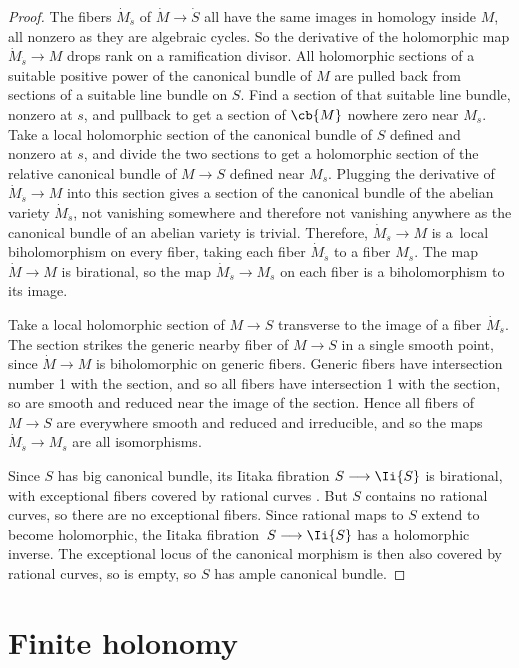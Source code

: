 \begin{proof}
The fibers $\dot{M}_{\dot{s}}$ of $\dot{M} \to \dot{S}$ all have the same images in homology inside $M$, all nonzero as they are algebraic cycles.
So the derivative of the holomorphic map $\dot{M}_{\dot{s}} \to M$ drops rank on a ramification divisor.
All holomorphic sections of a suitable positive power of the canonical bundle of $M$ are pulled back from sections of a suitable line bundle on $S$.
Find a section of that suitable line bundle, nonzero at $s$, and pullback to get a section of $\cb{M}$ nowhere zero near $M_{s}$.
Take a local holomorphic section of the canonical bundle of $S$ defined and nonzero at $s$, and divide the two sections to get a holomorphic section of the relative canonical bundle of $M \to S$ defined near $M_{s}$.
Plugging the derivative of $\dot{M}_{\dot{s}} \to M$ into this section gives a section of the canonical bundle of the abelian variety $\dot{M}_{\dot{s}}$, not vanishing somewhere and therefore not vanishing anywhere as the canonical bundle of an abelian variety is trivial.
Therefore, $\dot{M}_{\dot{s}} \to M$ is a~local biholomorphism on every fiber, taking each fiber $\dot{M}_{\dot{s}}$ to a fiber $M_{s}$.
The map $\dot{M} \to M$ is birational, so the map $\dot{M}_{\dot{s}} \to M_{s}$ on each fiber is a biholomorphism to its image.

Take a local holomorphic section of $M \longrightarrow
 S$ transverse to the image of a fiber $\dot{M}_{\dot{s}}$.
The section strikes the generic nearby fiber of $M \to S$ in a single smooth point, since $\dot{M} \longrightarrow
M$ is biholomorphic on generic fibers.
Generic fibers have intersection number 1 with the section, and so all fibers have intersection 1 with the section, so are smooth and reduced near the image of the section.
Hence all fibers of $M \longrightarrow
S$ are everywhere smooth and reduced and irreducible, and so the maps $\dot{M}_{\dot{s}} \to M_{s}$ are all isomorphisms.

Since $S$ has big canonical bundle, its Iitaka fibration $S \longrightarrow
 \Ii{S}$ is birational, with exceptional fibers covered by rational curves \cite{Kawamata:1991}.
But $S$ contains no rational curves, so there are no exceptional fibers.
Since rational maps to $S$ extend to become holomorphic, the Iitaka fibration~${S \longrightarrow
 \Ii{S}}$ has a holomorphic inverse.
The exceptional locus of the canonical morphism is then also covered by rational curves, so is empty, so $S$ has ample canonical bundle.
\end{proof}

\section{Finite holonomy}

